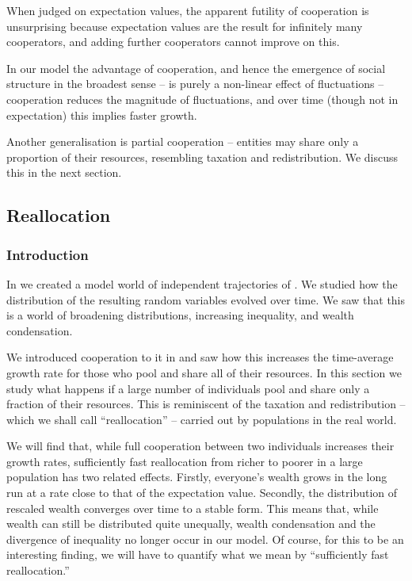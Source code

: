 When judged on expectation values, the apparent futility of cooperation is unsurprising
because expectation values are the result for infinitely 
many cooperators, and adding further cooperators cannot improve on this.

In our model the advantage of cooperation, and hence the emergence
of social structure in the broadest sense -- is purely a non-linear 
effect of fluctuations -- cooperation reduces the magnitude of 
fluctuations, and over time (though not in expectation) this implies faster growth. 


Another generalisation is partial cooperation -- entities may share only
a proportion of their resources, resembling taxation and redistribution. We discuss this in the next section.


\subsection{Reallocation}


\subsubsection{Introduction}

In  we created a model world of independent trajectories of \GBM. We studied how the distribution of the resulting random variables evolved over time. We saw that this is a world of broadening distributions, increasing inequality, and wealth condensation.

We introduced cooperation to it in  and saw how this increases the time-average growth rate for those who pool and share all of their resources. In this section we study what happens if a large number of individuals pool and share only a fraction of their resources. This is reminiscent of the taxation and redistribution -- which we shall call ``reallocation'' -- carried out by populations in the real world.

We will find that, while full cooperation between two individuals increases their growth rates, sufficiently fast reallocation from richer to poorer in a large population has two related effects. Firstly, everyone's wealth grows in the long run at a rate close to that of the expectation value. Secondly, the distribution of rescaled wealth converges over time to a stable form. This means that, while wealth can still be distributed quite unequally, wealth condensation and the divergence of inequality no longer occur in our model. Of course, for this to be an interesting finding, we will have to quantify what we mean by ``sufficiently fast reallocation.''

